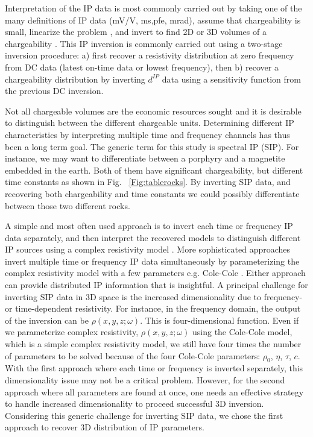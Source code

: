 \documentclass[letterpaper,11pt]{article}
\newcommand{\dip}{d^{IP}}
\begin{document}
Interpretation of the IP data is most commonly carried out by taking one of the many definitions of IP data (mV/V, ms,pfe, mrad), assume that chargeability is small, linearize  the problem \cite[]{seigel1959}, and invert to find 2D or 3D volumes of a chargeability \cite[]{doug1994}. 
This IP inversion is commonly carried out using a two-stage inversion procedure: a) first recover a resistivity distribution at zero frequency from DC data (latest on-time data or lowest frequency), then b) recover a chargeability distribution by inverting $\dip$ data using a sensitivity function from the previous DC inversion.

Not all chargeable volumes are the economic resources sought and it is desirable to distinguish between the different chargeable units. Determining different IP characteristics by interpreting multiple time and frequency channels has thus been a long term goal. The generic term for this study is spectral IP (SIP). For instance, we may want to differentiate between a porphyry and a magnetite embedded in the earth. Both of them have significant chargeability, but different time constants as shown in Fig. ~\ref{Fig:tablerocks}. By inverting SIP data, and recovering both chargeability and time constants we could possibly differentiate between those two different rocks. 

A simple and most often used approach is to invert each time or frequency IP data separately, and then interpret the recovered models to distinguish different IP sources using a complex resistivity model \cite[]{Yuval1997,Kemna2004,Hordt2006}. 
More sophisticated approaches invert multiple time or frequency IP data simultaneously by parameterizing the complex resistivity model with a few parameters e.g. Cole-Cole \cite[]{Kemna2004,Fiandaca2012}. Either approach can provide distributed IP information that is insightful. A principal challenge for inverting SIP data in 3D space is the increased dimensionality due to frequency- or time-dependent resistivity. For instance, in the frequency domain, the output of the inversion can be $\rho(x,y,z;\omega)$. This is four-dimensional function. Even if we parameterize complex resistivity, $\rho(x,y,z;\omega)$  using the Cole-Cole model, which is a simple complex resistivity model, we still have four times the number of parameters to be solved  because of the four Cole-Cole parameters: $\rho_0$, $\eta$, $\tau$, $c$. 
With the first approach where each time or frequency is inverted separately, this dimensionality issue may not be a critical problem. However, for the second approach where all parameters are found at once, one needs an effective strategy to handle increased dimensionality to proceed successful 3D inversion. Considering this generic challenge for inverting SIP data, we chose the first approach to recover 3D distribution of IP parameters. 
\end{document}
